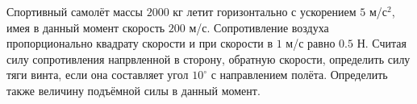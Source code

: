 Спортивный самолёт массы $2000$ кг летит горизонтально
с ускорением $5$ м/с$^2$, имея в данный момент скорость $200$ м/с.
Сопротивление воздуха пропорционально квадрату скорости
и при скорости в $1$ м/с равно $0.5$ Н.
Считая силу сопротивления напрвленной в сторону, обратную скорости,
определить силу тяги винта, если она составляет угол $10^{\circ}$
с направлением полёта.
Определить также величину подъёмной силы в данный момент.
